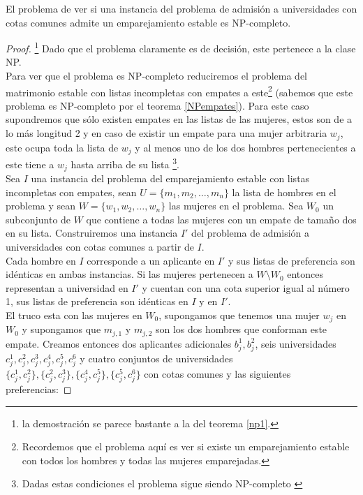 \begin{teo} \cite{Todo}
El problema de ver si una instancia del problema de admisión a universidades con cotas comunes admite un emparejamiento estable es NP-completo. 
\end{teo}
\begin{proof}
\footnote{la demostración se parece bastante a la del teorema \ref{np1}.}
Dado que el problema claramente es de decisión, este pertenece a la clase NP. \\ Para ver que el problema es NP-completo reduciremos el problema del matrimonio estable con listas incompletas con empates a este\footnote{Recordemos que el problema aquí es ver si existe un emparejamiento estable con todos los hombres y todas las mujeres emparejadas.} (sabemos que este problema es NP-completo por el teorema \ref{NPempates}). Para este caso supondremos que sólo existen empates en las listas de las mujeres, estos son de a lo más longitud 2 y en caso de existir un empate para una mujer arbitraria $w_j$, este ocupa toda la lista de $w_j$ y al menos uno de los dos hombres pertenecientes a este tiene a $w_j$ hasta arriba de su lista \footnote{Dadas estas condiciones el problema sigue siendo NP-completo \cite{empates}}. \\
Sea $I$ una instancia del problema del emparejamiento estable con listas incompletas con empates, sean $U=\{m_1,m_2,\dots,m_n\}$ la lista de hombres en el problema y sean $W=\{w_1,w_2,\dots,w_n\}$ las mujeres en el problema. Sea $W_0$ un subconjunto de $W$ que contiene a todas las mujeres con un empate de tamaño dos en su lista. Construiremos una instancia $I'$ del problema de admisión a universidades con cotas comunes a partir de $I$. \\
Cada hombre en $I$ corresponde a un aplicante en $I'$ y sus listas de preferencia son idénticas en ambas instancias. Si las mujeres pertenecen a $W \setminus W_0$ entonces representan a universidad en $I'$ y cuentan con una cota superior igual al número 1, sus listas de preferencia son idénticas en $I$ y en $I'$. \\
El truco esta con las mujeres en $W_0$, supongamos que tenemos una mujer $w_j$ en $W_0$ y supongamos que $m_{j,1}$ y $m_{j,2}$ son los dos hombres que conforman este empate. Creamos entonces dos aplicantes adicionales $b_j^1,b_j^2$, seis universidades $c_j^1,c_j^2,c_j^3,c_j^4,c_j^5,c_j^6$ y cuatro conjuntos de universidades $\{c_j^1,c_j^2\},\{c_j^2,c_j^3\},\{c_j^4,c_j^5\},\{c_j^5,c_j^6\}$ con cotas comunes y las siguientes preferencias: 


\end{proof}
